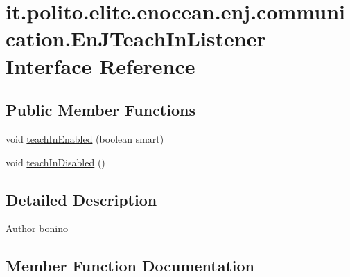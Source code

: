 \hypertarget{interfaceit_1_1polito_1_1elite_1_1enocean_1_1enj_1_1communication_1_1_en_j_teach_in_listener}{}\section{it.\+polito.\+elite.\+enocean.\+enj.\+communication.\+En\+J\+Teach\+In\+Listener Interface Reference}
\label{interfaceit_1_1polito_1_1elite_1_1enocean_1_1enj_1_1communication_1_1_en_j_teach_in_listener}
\subsection*{Public Member Functions}
\begin{DoxyCompactItemize}
\item 
void \hyperlink{interfaceit_1_1polito_1_1elite_1_1enocean_1_1enj_1_1communication_1_1_en_j_teach_in_listener_ab0ddfc514ad2982f93b22f70f8b01ca6}{teach\+In\+Enabled} (boolean smart)
\item 
void \hyperlink{interfaceit_1_1polito_1_1elite_1_1enocean_1_1enj_1_1communication_1_1_en_j_teach_in_listener_a881f4811394fdd27c16c9055c7684db0}{teach\+In\+Disabled} ()
\end{DoxyCompactItemize}


\subsection{Detailed Description}
\begin{DoxyAuthor}{Author}
bonino 
\end{DoxyAuthor}


\subsection{Member Function Documentation}
\hypertarget{interfaceit_1_1polito_1_1elite_1_1enocean_1_1enj_1_1communication_1_1_en_j_teach_in_listener_a881f4811394fdd27c16c9055c7684db0}{}\label{interfaceit_1_1polito_1_1elite_1_1enocean_1_1enj_1_1communication_1_1_en_j_teach_in_listener_a881f4811394fdd27c16c9055c7684db0} 
